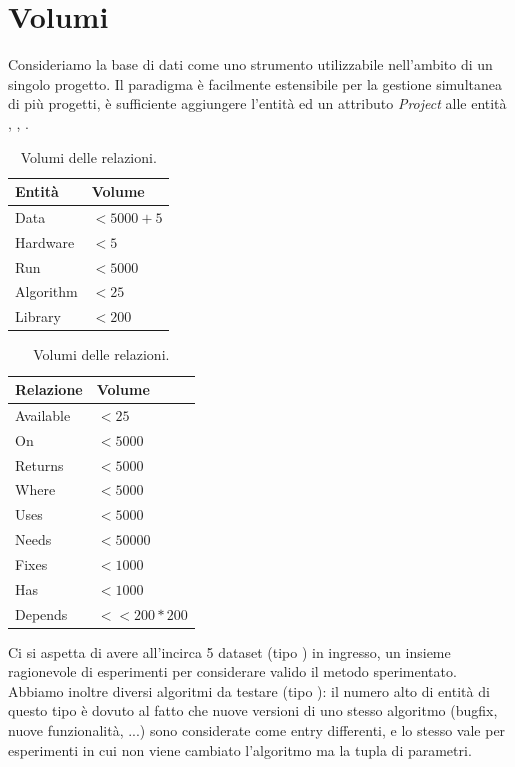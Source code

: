 \documentclass{article}
\begin{document}
\section{Volumi}
Consideriamo la base di dati come uno strumento utilizzabile nell'ambito di un singolo progetto. Il paradigma è facilmente estensibile per la gestione simultanea di più progetti, è sufficiente aggiungere l'entità  ed un attributo \emph{Project} alle entità , , .
\begin{table}[H]
    \begin{minipage}[b]{.5\linewidth}
      \centering
      \begin{tabular}{||l l||}
        \hline
        Entità & Volume \\ [0.5ex]
        \hline\hline
        Data & $<5000 + 5$\\
        Hardware & $<5$\\
        Run & $<5000$\\
        Algorithm & $<25$\\
        Library & $<200$\\
        \hline
       \end{tabular}
       \caption{Volumi delle entità.}
    \end{minipage}
    \begin{minipage}[b]{.5\linewidth}
      \centering
        \begin{tabular}{||l l||}
            \hline
            Relazione & Volume \\ [0.5ex]
            \hline\hline
            Available & $<25$\\
            On & $<5000$\\
            Returns & $<5000$\\
            Where & $<5000$\\
            Uses & $<5000$\\
            Needs & $<50000$\\
            Fixes & $<1000$\\
            Has & $<1000$\\
            Depends & $<<200*200$\\
            \hline
           \end{tabular}
           \caption{Volumi delle relazioni.}
    \end{minipage}
\end{table}

Ci si aspetta di avere all'incirca 5 dataset (tipo ) in ingresso, un insieme ragionevole di esperimenti per considerare valido il metodo sperimentato. Abbiamo inoltre diversi algoritmi da testare  (tipo ): il numero alto di entità di questo tipo è dovuto al fatto che nuove versioni di uno stesso algoritmo (bugfix, nuove funzionalità, ...) sono considerate come entry differenti, e lo stesso vale per esperimenti in cui non viene cambiato l'algoritmo ma la tupla di parametri.
\end{document}
